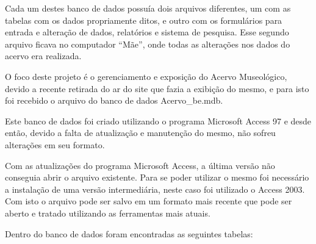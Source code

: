 \documentclass[a4paper,12pt,oneside,onecolumn,final,fleqn]{repUERJ}
\begin{document}
Cada um destes banco de dados possuía dois arquivos diferentes, um com as tabelas com os dados propriamente ditos, e outro com os formulários para entrada e alteração de dados, relatórios e sistema de pesquisa. Esse segundo arquivo ficava no computador ``Mãe'', onde todas as alterações nos dados do acervo era realizada.

O foco deste projeto é o gerenciamento e exposição do Acervo Museológico, devido a recente retirada do ar do site que fazia a exibição do mesmo, e para isto foi recebido o arquivo do banco de dados Acervo\_be.mdb.

Este banco de dados foi criado utilizando o programa Microsoft Access 97 e desde então, devido a falta de atualização e manutenção do mesmo, não sofreu alterações em seu formato.

Com as atualizações do programa Microsoft Access, a última versão não conseguia abrir o arquivo existente. Para se poder utilizar o mesmo foi necessário a instalação de uma versão intermediária, neste caso foi utilizado o Access 2003. Com isto o arquivo pode ser salvo em um formato mais recente que pode ser aberto e tratado utilizando as ferramentas mais atuais.

Dentro do banco de dados foram encontradas as seguintes tabelas:
\end{document}
